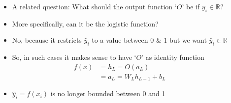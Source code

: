 \begin{frame}
  \begin{columns}
    \begin{overlayarea}{\textwidth}{\textheight}
      \makebox[\textwidth][c]{\usebox{\nncontent}}
    \end{overlayarea}


    \begin{overlayarea}{\textwidth}{\textheight}
      \begin{itemize}[<+->]
        \item A related question: What should the output function `$O$' be if $y_i \in \mathbb{R}$?
        \item More specifically, can it be the logistic function?
        \item No, because it restricts $\hat{y}_i$ to a value between $0$ \& $1$ but we want $\hat{y}_i \in \mathbb{R}$
        \item So, in such cases it makes sense to have `$O$' as identity function
            \begin{align*}
              f(x) & = h_{L} = O(a_{L})             \\
                 & = a_{L} = W_{L}h_{L-1} + b_{L}
            \end{align*}

        \item $\hat{y}_i = f(x_i)$ is no longer bounded between 0 and 1
      \end{itemize}
    \end{overlayarea}
  \end{columns}
\end{frame}

\begin{frame}[b]
\end{frame}

